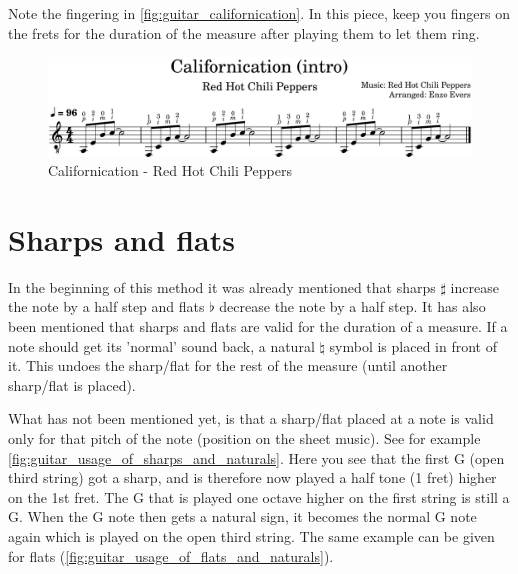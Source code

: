 Note the fingering in \autoref{fig:guitar_californication}. In this piece, keep you fingers on the frets for the duration of the measure after playing them to let them ring.

\begin{figure}[h]
	\centering
	\includegraphics[width=\textwidth]{../../MuseScore/Guitar/GuitarCalifornicationRedHotChiliPeppers.png}
	\caption{Californication - Red Hot Chili Peppers}
	\label{fig:guitar_californication}
\end{figure}

\newpage

\section{Sharps and flats}

In the beginning of this method it was already mentioned that sharps $\sharp$ increase the note by a half step and flats $\flat$ decrease the note by a half step. It has also been mentioned that sharps and flats are valid for the duration of a measure. If a note should get its 'normal' sound back, a natural $\natural$ symbol is placed in front of it. This undoes the sharp/flat for the rest of the measure (until another sharp/flat is placed).

What has not been mentioned yet, is that a sharp/flat placed at a note is valid only for that pitch of the note (position on the sheet music). See for example \autoref{fig:guitar_usage_of_sharps_and_naturals}. Here you see that the first G (open third string) got a sharp, and is therefore now played a half tone (1 fret) higher on the 1st fret. The G that is played one octave higher on the first string is still a G. When the G note then gets a natural sign, it becomes the normal G note again which is played on the open third string. The same example can be given for flats (\autoref{fig:guitar_usage_of_flats_and_naturals}).

